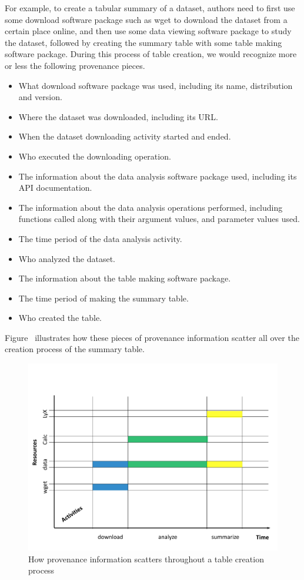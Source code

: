 For example, to create a tabular summary of a dataset, authors need to first use some download software package such as wget to download the dataset from a certain place online, and then use some data viewing software package to study the dataset, followed by creating the summary table with some table making software package. During this process of table creation, we would recognize more or less the following provenance pieces.
\begin{itemize}
\item What download software package was used, including its name, distribution and version.
\item Where the dataset was downloaded, including its URL.
\item When the dataset downloading activity started and ended.
\item Who executed the downloading operation.
\item The information about the data analysis software package used, including its API documentation.
\item The information about the data analysis operations performed, including functions called along with their argument values, and parameter values used. 
\item The time period of the data analysis activity.
\item Who analyzed the dataset.
\item The information about the table making software package.
\item The time period of making the summary table.
\item Who created the table.
\end{itemize}
Figure~\cite{prov-pieces} illustrates how these pieces of provenance information scatter all over the creation process of the summary table.
\begin{figure}
\label{prov-pieces}
\centering
\includegraphics[scale=0.5]{prov-pieces}
\caption{How provenance information scatters throughout a table creation process}
\end{figure}
